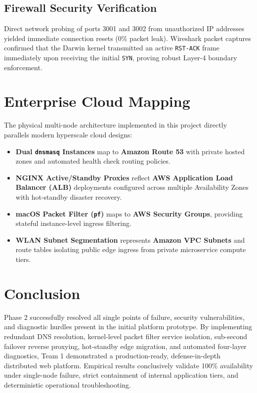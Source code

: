 \documentclass[conference]{IEEEtran}
\begin{document}
\subsection{Firewall Security Verification}
Direct network probing of ports 3001 and 3002 from unauthorized IP addresses yielded immediate connection resets ($0\%$ packet leak). Wireshark packet captures confirmed that the Darwin kernel transmitted an active \texttt{RST-ACK} frame immediately upon receiving the initial \texttt{SYN}, proving robust Layer-4 boundary enforcement.

\section{Enterprise Cloud Mapping}
The physical multi-node architecture implemented in this project directly parallels modern hyperscale cloud designs:
\begin{itemize}
    \item \textbf{Dual \texttt{dnsmasq} Instances} map to \textbf{Amazon Route 53} with private hosted zones and automated health check routing policies.
    \item \textbf{NGINX Active/Standby Proxies} reflect \textbf{AWS Application Load Balancer (ALB)} deployments configured across multiple Availability Zones with hot-standby disaster recovery.
    \item \textbf{macOS Packet Filter (\texttt{pf})} maps to \textbf{AWS Security Groups}, providing stateful instance-level ingress filtering.
    \item \textbf{WLAN Subnet Segmentation} represents \textbf{Amazon VPC Subnets} and route tables isolating public edge ingress from private microservice compute tiers.
\end{itemize}

\section{Conclusion}
Phase 2 successfully resolved all single points of failure, security vulnerabilities, and diagnostic hurdles present in the initial platform prototype. By implementing redundant DNS resolution, kernel-level packet filter service isolation, sub-second failover reverse proxying, hot-standby edge migration, and automated four-layer diagnostics, Team 1 demonstrated a production-ready, defense-in-depth distributed web platform. Empirical results conclusively validate 100\% availability under single-node failure, strict containment of internal application tiers, and deterministic operational troubleshooting.
\end{document}
